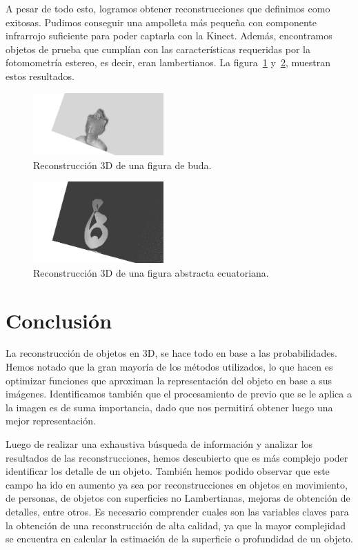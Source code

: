 \documentclass[twocolumn,11pts]{IEEEtran}
\begin{document}
A pesar de todo esto, logramos obtener reconstrucciones que definimos como exitosas. Pudimos conseguir una ampolleta más pequeña con componente infrarrojo suficiente para poder captarla con la Kinect. Además, encontramos objetos de prueba que cumplían con las características requeridas por la fotomometría estereo, es decir, eran lambertianos. La figura~\ref{mona} y~\ref{niple}, muestran estos resultados.

\begin{figure}[t]
\begin{center}
	\includegraphics[width= 5cm]{3dmona01}
		\caption{Reconstrucción 3D de una figura de buda.}
		\label{mona}
\end{center}
\end{figure}

\begin{figure}[t]
\begin{center}
	\includegraphics[width= 5cm]{3dniple02}
		\caption{Reconstrucción 3D de una figura abstracta ecuatoriana.}
		\label{niple}
\end{center}
\end{figure}

\section{Conclusión}
La reconstrucción de objetos en 3D, se hace todo en base a las probabilidades. Hemos notado que la gran mayoría de los métodos utilizados, lo que hacen es optimizar funciones que aproximan la representación del objeto en base a sus imágenes. Identificamos también que el procesamiento de previo que se le aplica a la imagen es de suma importancia, dado que nos permitirá obtener luego una mejor representación.

Luego de realizar una exhaustiva búsqueda de información y analizar los resultados de las reconstrucciones, hemos descubierto que es más complejo poder identificar los detalle de un objeto. También hemos podido observar que este campo ha ido en aumento ya sea por reconstrucciones en objetos en movimiento, de personas, de objetos con superficies no Lambertianas, mejoras de obtención de detalles, entre otros. Es necesario comprender cuales son las variables claves para la obtención de una reconstrucción de alta calidad, ya que la mayor complejidad se encuentra en calcular la estimación de la superficie o profundidad de un objeto.
\end{document}
